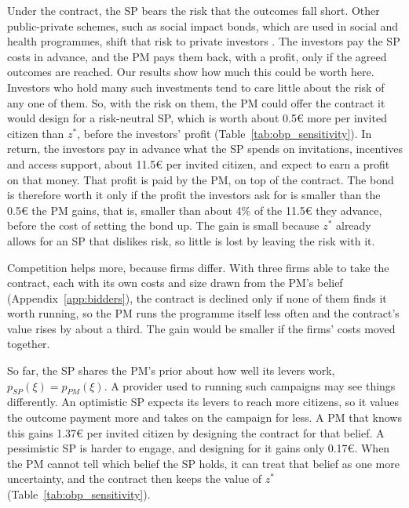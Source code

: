 \documentclass[12pt]{article}
\begin{document}
Under the contract, the SP bears the risk that the outcomes fall short. Other public-private schemes, such as social impact bonds, which are used in social and health programmes, shift that risk to private investors \citep{fraser2018narratives}. The investors pay the SP costs in advance, and the PM pays them back, with a profit, only if the agreed outcomes are reached. Our results show how much this could be worth here. Investors who hold many such investments tend to care little about the risk of any one of them. So, with the risk on them, the PM could offer the contract it would design for a risk-neutral SP, which is worth about 0.5€ more per invited citizen than $z^*$, before the investors' profit (Table~\ref{tab:obp_sensitivity}). In return, the investors pay in advance what the SP spends on invitations, incentives and access support, about 11.5€ per invited citizen, and expect to earn a profit on that money. That profit is paid by the PM, on top of the contract. The bond is therefore worth it only if the profit the investors ask for is smaller than the 0.5€ the PM gains, that is, smaller than about 4\% of the 11.5€ they advance, before the cost of setting the bond up. The gain is small because $z^*$ already allows for an SP that dislikes risk, so little is lost by leaving the risk with it.

Competition helps more, because firms differ. With three firms able to take the contract, each with its own costs and size drawn from the PM's belief (Appendix~\ref{app:bidders}), the contract is declined only if none of them finds it worth running, so the PM runs the programme itself less often and the contract's value rises by about a third. The gain would be smaller if the firms' costs moved together.

So far, the SP shares the PM's prior about how well its levers work, $p_{SP}(\xi) = p_{PM}(\xi)$. A provider used to running such campaigns may see things differently. An optimistic SP expects its levers to reach more citizens, so it values the outcome payment more and takes on the campaign for less. A PM that knows this gains 1.37€ per invited citizen by designing the contract for that belief. A pessimistic SP is harder to engage, and designing for it gains only 0.17€. When the PM cannot tell which belief the SP holds, it can treat that belief as one more uncertainty, and the contract then keeps the value of $z^*$ (Table~\ref{tab:obp_sensitivity}).
\end{document}
